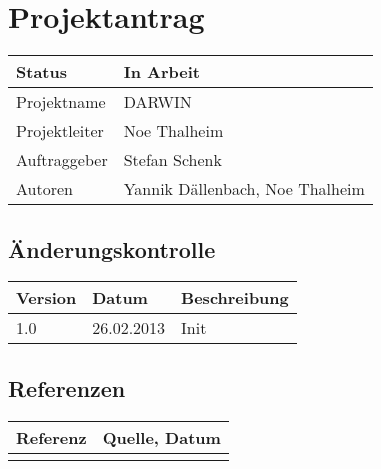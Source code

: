 \documentclass{scrartcl}
\begin{document}
	\section*{Projektantrag}
	
	\begin{tabularx}{\textwidth}{| X | X |}
	\hline
	Status & In Arbeit\\
	\hline
	Projektname & DARWIN\\
	\hline
	Projektleiter & Noe Thalheim\\
	\hline
	Auftraggeber & Stefan Schenk\\
	\hline
	Autoren & Yannik Dällenbach, Noe Thalheim\\
	\hline
	\end{tabularx}
	
	\subsection*{Änderungskontrolle}
	\begin{tabularx}{\textwidth}{| X | X | X |}
	\hline
	\rowcolor[gray]{0.9} Version & Datum & Beschreibung\\
	\hline
	1.0 & 26.02.2013 & Init\\
	\hline
	\end{tabularx}

	\subsection*{Referenzen}
	
	\begin{tabular}{| l | l | }
	\hline
	\rowcolor[gray]{0.9} Referenz & Quelle, Datum\\
	\hline
	 & \\
	 \hline
	\end{tabular}
	
	\pagebreak
	\tableofcontents
	\pagebreak
	
\end{document}
